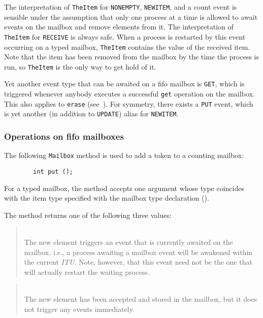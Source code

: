 \medskip

The interpretation of {\tt TheItem} for {\tt NONEMPTY},
{\tt NEWITEM}, and a count event is sensible under the assumption that
only one process at a time
is allowed to await events on the mailbox and remove elements from it.
The interpretation of {\tt TheItem} for {\tt RECEIVE} is always safe.
When a process is restarted by this event occurring on a typed mailbox,
{\tt TheItem} contains the value of the received item.
Note that the item has been removed from the mailbox by the time the
process is run, so {\tt TheItem} is the only way to get hold of it.

Yet another event type that can be awaited on a fifo mailbox is {\tt GET},
which is triggered whenever anybody
executes a successful {\tt get} operation on the mailbox.
This also applies to {\tt erase} (see~).
For symmetry, there exists a {\tt PUT} event, which is yet another
(in addition to {\tt UPDATE}) alias for
{\tt NEWITEM}.

\subsubsection{Operations on fifo mailboxes}
\label{rm_mb_fi_op}

The following {\tt Mailbox} method is used to add a token to a counting
mailbox:
\begin{verbatim}
        int put ();
\end{verbatim}
For a typed mailbox, the method accepts one argument whose type coincides
with the item type specified with the mailbox type declaration
().

The method returns one of
the following three values:

\medskip

\begin{quote}
\noindent{}\\ \hspace{0in}
The new element triggers an event that is currently
awaited on the mailbox, i.e., a process awaiting a mailbox event
will be awakened within the current {\em ITU}.
Note, however, that this event need not be the one that will
actually restart the waiting process.
\end{quote}

\begin{quote}
\noindent{}\\ \hspace{0in}
The new element has been accepted and stored in the mailbox, but
it does not trigger any events immediately.
\end{quote}

